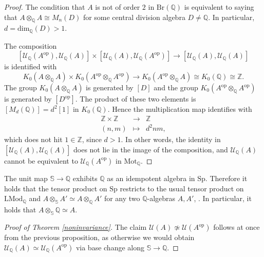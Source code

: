 \documentclass[10pt]{amsart}
\theoremstyle{definition}
\newcommand{\Sp}{\mathrm{Sp}}
\newcommand{\op}{\mathrm{op}}
\begin{document}
\begin{proof}
The condition that $A$ is not of order $2$ in $\mathrm{Br}(\mathbb{Q})$ is  equivalent to saying that $ A \otimes_\mathbb{Q} A \cong M_n(D)$ for some central division algebra $D \neq \mathbb{Q}$. In particular, $d = \mathrm{dim}_\mathbb{Q}(D) > 1$.

The composition
\[ [ \mathcal{U}_\mathbb{Q}(A^{\op}),  \mathcal{U}_\mathbb{Q}(A) ] \times [ \mathcal{U}_\mathbb{Q}(A),  \mathcal{U}_\mathbb{Q}(A^{\op}) ] \rightarrow [ \mathcal{U}_\mathbb{Q}(A), \mathcal{U}_\mathbb{Q}(A) ] \]
is identified with
$$ K_0( A \otimes_\mathbb{Q} A  ) \times K_0( A^{\op} \otimes_\mathbb{Q} A^{\op}  ) \rightarrow K_0( A^{\op} \otimes_\mathbb{Q} A  )  \cong K_0( \mathbb{Q}  ) \cong \mathbb{Z}.$$
The group  $K_0( A \otimes_\mathbb{Q} A  )$ is generated by $[D]$ and the group $K_0( A^{\op} \otimes_\mathbb{Q} A^{\op}  )$ is generated by $[D^{\op}]$. The product of these two elements is $[M_{d}(\mathbb{Q})] = d^2[1]$ in $K_0( \mathbb{Q}  )$. Hence the multiplication map identifies with
$$ \begin{array}{rcl}
\mathbb{Z} \times \mathbb{Z} & \rightarrow & \mathbb{Z} \\
(n, m) & \mapsto & d^2 nm,
\end{array} $$
which does not hit $1 \in \mathbb{Z}$, since $d > 1$. In other words, the identity in $[ \mathcal{U}_\mathbb{Q}(A), \mathcal{U}_\mathbb{Q}(A) ]$ does not lie in the image of the composition, and $\mathcal{U}_\mathbb{Q}(A)$ cannot be equivalent to $\mathcal{U}_\mathbb{Q}(A^{\op})$ in $\mathrm{Mot}_\mathbb{Q}$.
\end{proof}

The unit map $\mathbb{S} \rightarrow \mathbb{Q}$ exhibits $\mathbb{Q}$ as an idempotent algebra in $\Sp$. Therefore it holds that the tensor product on $\Sp$ restricts to the usual tensor product on $\mathrm{LMod}_\mathbb{Q}$ and $A \otimes_\mathbb{S} A' \simeq A \otimes_\mathbb{Q} A'$ for any two $\mathbb{Q}$-algebras $A, A'$, \cite[Proposition 4.8.2.7]{lurieha}. In particular, it holds that $A \otimes_\mathbb{S} \mathbb{Q} \simeq A$.

\begin{proof}[Proof of Theorem \ref{noninvariance}]
The claim $\mathcal{U}(A) \not\simeq \mathcal{U}(A^{\op})$ follows at once from the previous proposition, as otherwise we would obtain $\mathcal{U}_\mathbb{Q}(A) \simeq \mathcal{U}_\mathbb{Q}(A^{\op})$ via base change along $\mathbb{S} \rightarrow \mathbb{Q}$.
\end{proof}
\end{document}
